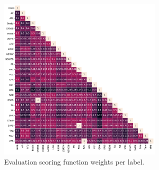 \documentclass[\main/thesis.tex]{subfiles}
\begin{document}
\begin{figure}[t]
    \centering
    \includegraphics[trim={0.3cm 0.3cm 0.3cm 0.3cm},clip,width=8cm]{figure/aenc_label_weights.pdf}
    \caption{Evaluation scoring function weights per label.}
    \label{fig:dataset_labeldx}
\end{figure}
\end{document}
